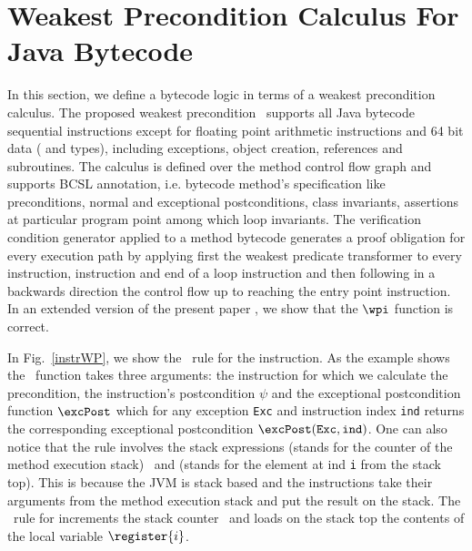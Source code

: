
\section{Weakest Precondition Calculus For Java Bytecode}\label{wpbc}
In this section, we define a bytecode logic in terms of a weakest precondition calculus. The proposed weakest precondition \wpi \ supports all Java bytecode sequential instructions except for floating point arithmetic instructions and 64 bit data ( and  types), including exceptions, object creation,
 references and subroutines. The calculus is defined over the method control flow graph and supports BCSL annotation,
 i.e. bytecode method's specification like preconditions, normal and exceptional postconditions, class invariants,
 assertions at particular program point among which loop invariants. The verification condition generator applied to a method 
bytecode generates a proof obligation for every execution path
 by applying first the weakest predicate transformer to every  instruction,
  instruction and end of a loop instruction and then following in a backwards direction the control
 flow up to reaching the entry point instruction.
 In an extended version of the present paper \cite{JBL05MP}, we show that the $\wpi$ function is correct.

 In Fig.~\ref{instrWP}, we show the \wpi \ rule for the  instruction.
 As the example shows the \wpi \ function takes three arguments:
the instruction for which we calculate the precondition, 
the instruction's postcondition $\psi$ and the exceptional postcondition function $\excPost$ which for any exception \texttt{Exc} and 
instruction index \texttt{ind} returns the
corresponding exceptional postcondition $\excPost(\texttt{Exc}, \tt{ind})$. One can also notice that the rule involves the stack expressions \counter 
(stands for the counter of the method execution stack) \ and  (stands for the element at ind \texttt{i} from the stack top).
 This is because the JVM is stack based and the instructions take their arguments from the method execution stack and 
 put the result on the stack.
 The \wpi \ rule for   increments the stack counter \counter \ and loads on the stack top the contents
 of the local variable $\register{i}$. 




